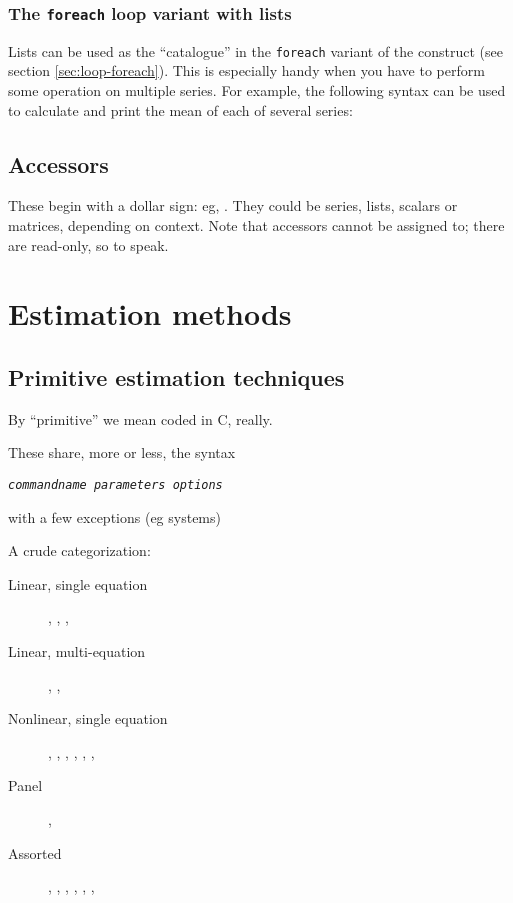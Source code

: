 \subsection{The \texttt{foreach} loop variant with lists}

Lists can be used as the ``catalogue'' in the \texttt{foreach} variant
of the  construct (see section \ref{sec:loop-foreach}). This
is especially handy when you have to perform some operation on
multiple series. For example, the following syntax can be used to
calculate and print the mean of each of several series:

\section{Accessors}
\label{sec:accessors}
 
These begin with a dollar sign: eg, . They could be
series, lists, scalars or matrices, depending on context. Note that
accessors cannot be assigned to; there are read-only, so to speak.

\chapter{Estimation methods}
\label{chap:estimation}

\section{Primitive estimation techniques}
\label{sec:canned}

By ``primitive'' we mean coded in C, really.

These share, more or less, the syntax
\begin{flushleft}
\texttt{\emph{commandname parameters options}}
\end{flushleft}
with a few exceptions (eg systems)

A crude categorization: 
\begin{description}
\item[Linear, single equation] , , ,
\item[Linear, multi-equation] , ,  
\item[Nonlinear, single equation] , ,
  , , , ,
\item[Panel] , 
\item[Assorted] , , ,
  , , , 
\end{description}

